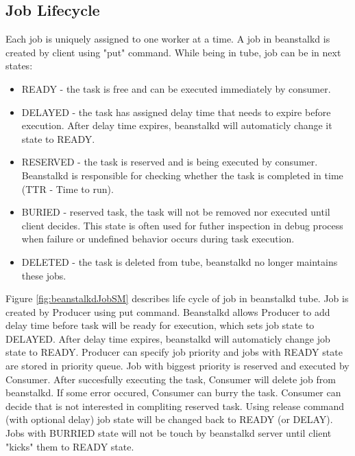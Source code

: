     \subsection{Job Lifecycle}
    Each job is uniquely assigned to one worker at a time. A job in beanstalkd is created by client using "put" command. While being in tube, job can be in next states\cite{beanstalkdProtocol}:
    \begin{itemize}
        \item READY - the task is free and can be executed immediately by consumer.
        \item DELAYED - the task has assigned delay time that needs to expire before execution. After delay time expires, beanstalkd will automaticly change it state to READY.
        \item RESERVED - the task is reserved and is being executed by consumer. Beanstalkd is responsible for checking whether the task is completed in time (TTR - Time to run).
        \item BURIED - reserved task, the task will not be removed nor executed until client decides. This state is often used for futher inspection in debug process when failure or undefined behavior occurs during task execution.
        \item DELETED - the task is deleted from tube, beanstalkd no longer maintains these jobs.
    \end{itemize}

    Figure \ref{fig:beanstalkdJobSM} describes life cycle of job in beanstalkd tube. Job is created by Producer using put command. Beanstalkd allows Producer to add delay time before task will be ready for execution, which sets job state to DELAYED. After delay time expires, beanstalkd will automaticly change job state to READY. Producer can specify job priority and jobs with READY state are stored in priority queue. Job with biggest priority is reserved and executed by Consumer. After succesfully executing the task, Consumer will delete job from beanstalkd. If some error occured, Consumer can burry the task. Consumer can decide that is not interested in compliting reserved task. Using release command (with optional delay) job state will be changed back to READY (or DELAY).
    Jobs with BURRIED state will not be touch by beanstalkd server until client "kicks" them to READY state.

